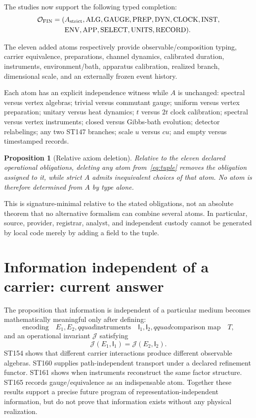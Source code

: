 \documentclass[11pt,a4paper]{article}
\newtheorem{proposition}[theorem]{Proposition}
\begin{document}
The studies now support the following typed completion:
\begin{equation}
\begin{aligned}
\mathcal O_{\rm FIN}=(&A_{\rm strict},\mathrm{ALG},\mathrm{GAUGE},\mathrm{PREP},
\mathrm{DYN},\mathrm{CLOCK},\mathrm{INST},\\
&\mathrm{ENV},\mathrm{APP},\mathrm{SELECT},\mathrm{UNITS},\mathrm{RECORD}).
\end{aligned}
\label{eq:tuple}
\end{equation}

The eleven added atoms respectively provide observable/composition typing, carrier equivalence, preparations, channel dynamics, calibrated duration, instruments, environment/bath, apparatus calibration, realized branch, dimensional scale, and an externally frozen event history.

Each atom has an explicit independence witness while $A$ is unchanged: spectral versus vertex algebras; trivial versus commutant gauge; uniform versus vertex preparation; unitary versus heat dynamics; $t$ versus $2t$ clock calibration; spectral versus vertex instruments; closed versus Gibbs-bath evolution; detector relabelings; any two ST147 branches; scale $u$ versus $cu$; and empty versus timestamped records.

\begin{proposition}[Relative axiom deletion]
Relative to the eleven declared operational obligations, deleting any atom from~\eqref{eq:tuple} removes the obligation assigned to it, while strict $A$ admits inequivalent choices of that atom. No atom is therefore determined from $A$ by type alone.
\end{proposition}

This is signature-minimal relative to the stated obligations, not an absolute theorem that no alternative formalism can combine several atoms. In particular, source, provider, registrar, analyst, and independent custody cannot be generated by local code merely by adding a field to the tuple.

\section{Information independent of a carrier: current answer}

The proposition that information is independent of a particular medium becomes mathematically meaningful only after defining:
\[
\text{encoding}\quad E_1,E_2,qquad
\text{instruments}\quad\mathsf I_1,\mathsf I_2,qquad
\text{comparison map}\quad T,
\]
and an operational invariant $\mathcal J$ satisfying
\[
\mathcal J(E_1,\mathsf I_1)=\mathcal J(E_2,\mathsf I_2).
\]
ST154 shows that different carrier interactions produce different observable algebras. ST160 supplies path-independent transport under a declared refinement functor. ST161 shows when instruments reconstruct the same factor structure. ST165 records gauge/equivalence as an indispensable atom. Together these results support a precise future program of representation-independent information, but do not prove that information exists without any physical realization.
\end{document}
